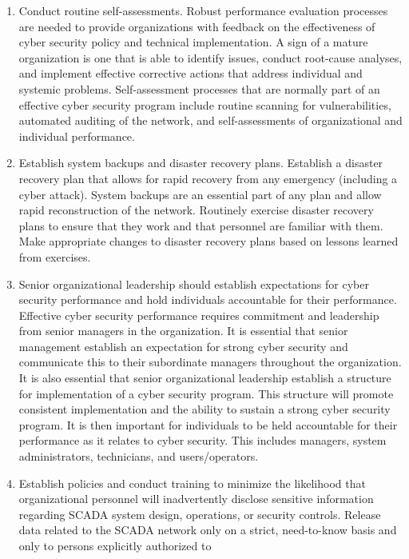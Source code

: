 \documentclass{article}
\begin{document}
\begin{enumerate}
\item
  Conduct routine self-assessments. Robust performance evaluation
  processes are needed to provide organizations with feedback on the
  effectiveness of cyber security policy and technical implementation. A
  sign of a mature organization is one that is able to identify issues,
  conduct root-cause analyses, and implement effective corrective
  actions that address individual and systemic problems. Self-assessment
  processes that are normally part of an effective cyber security
  program include routine scanning for vulnerabilities, automated
  auditing of the network, and self-assessments of organizational and
  individual performance.
\item
  Establish system backups and disaster recovery plans. Establish a
  disaster recovery plan that allows for rapid recovery from any
  emergency (including a cyber attack). System backups are an essential
  part of any plan and allow rapid reconstruction of the network.
  Routinely exercise disaster recovery plans to ensure that they work
  and that personnel are familiar with them. Make appropriate changes to
  disaster recovery plans based on lessons learned from exercises.
\item
  Senior organizational leadership should establish expectations for
  cyber security performance and hold individuals accountable for their
  performance. Effective cyber security performance requires commitment
  and leadership from senior managers in the organization. It is
  essential that senior management establish an expectation for strong
  cyber security and communicate this to their subordinate managers
  throughout the organization. It is also essential that senior
  organizational leadership establish a structure for implementation of
  a cyber security program. This structure will promote consistent
  implementation and the ability to sustain a strong cyber security
  program. It is then important for individuals to be held accountable
  for their performance as it relates to cyber security. This includes
  managers, system administrators, technicians, and users/operators.
\item
  Establish policies and conduct training to minimize the likelihood
  that organizational personnel will inadvertently disclose sensitive
  information regarding SCADA system design, operations, or security
  controls. Release data related to the SCADA network only on a strict,
  need-to-know basis and only to persons explicitly authorized to

\end{enumerate}
\end{document}
